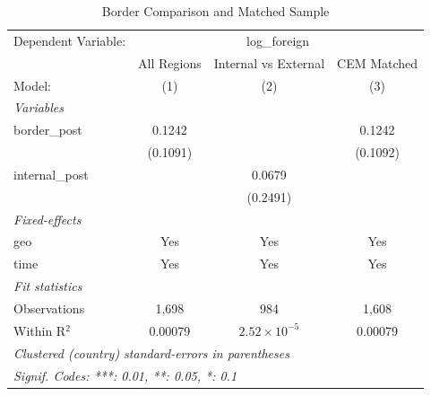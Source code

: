 
\begin{table}[htbp]
   \caption{\label{tab:borders} Border Comparison and Matched Sample}
   \centering
   \begin{tabular}{lccc}
      \tabularnewline \midrule \midrule
      Dependent Variable: & \multicolumn{3}{c}{log\_foreign}\\
                      & All Regions & Internal vs External  & CEM Matched \\   
      Model:          & (1)         & (2)                   & (3)\\  
      \midrule
      \emph{Variables}\\
      border\_post    & 0.1242      &                       & 0.1242\\   
                      & (0.1091)    &                       & (0.1092)\\   
      internal\_post  &             & 0.0679                &   \\   
                      &             & (0.2491)              &   \\   
      \midrule
      \emph{Fixed-effects}\\
      geo             & Yes         & Yes                   & Yes\\  
      time            & Yes         & Yes                   & Yes\\  
      \midrule
      \emph{Fit statistics}\\
      Observations    & 1,698       & 984                   & 1,608\\  
      Within R$^2$    & 0.00079     & $2.52\times 10^{-5}$  & 0.00079\\  
      \midrule \midrule
      \multicolumn{4}{l}{\emph{Clustered (country) standard-errors in parentheses}}\\
      \multicolumn{4}{l}{\emph{Signif. Codes: ***: 0.01, **: 0.05, *: 0.1}}\\
   \end{tabular}
\end{table}


